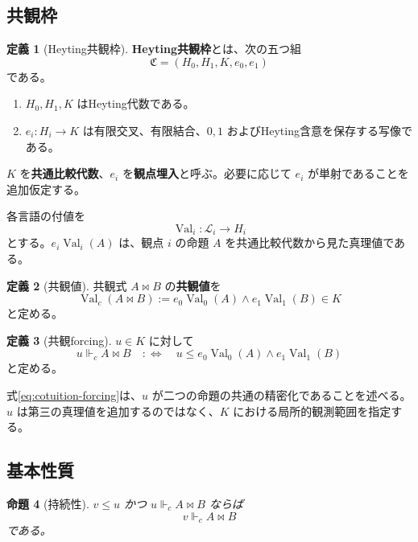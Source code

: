 \documentclass[a4paper,11pt]{ltjsarticle}
\theoremstyle{definition}
\newtheorem{definition}{定義}[section]
\theoremstyle{plain}
\newtheorem{proposition}[definition]{命題}
\newcommand{\Val}{\operatorname{Val}}
\newcommand{\forcesc}{\Vdash_{\!c}}
\begin{document}
\subsection{共観枠}

\begin{definition}[Heyting共観枠]
\textbf{Heyting共観枠}とは、次の五つ組
\[
 \mathfrak C=(H_0,H_1,K,e_0,e_1)
 \label{eq:cotuition-frame}
\]
である。
\begin{enumerate}
 \item $H_0,H_1,K$ はHeyting代数である。
 \item $e_i:H_i\to K$ は有限交叉、有限結合、$0,1$ およびHeyting含意を保存する写像である。
\end{enumerate}
$K$ を\textbf{共通比較代数}、$e_i$ を\textbf{観点埋入}と呼ぶ。必要に応じて $e_i$ が単射であることを追加仮定する。
\end{definition}

各言語の付値を
\[
 \Val_i:\mathcal L_i\longrightarrow H_i
\]
とする。$e_i\Val_i(A)$ は、観点 $i$ の命題 $A$ を共通比較代数から見た真理値である。

\begin{definition}[共観値]
共観式 $A\bowtie B$ の\textbf{共観値}を
\begin{equation}
 \Val_c(A\bowtie B)
 :=e_0\Val_0(A)\wedge e_1\Val_1(B)
 \in K
 \label{eq:cotuition-value}
\end{equation}
と定める。
\end{definition}

\begin{definition}[共観forcing]
$u\in K$ に対して
\begin{equation}
 u\forcesc A\bowtie B
 \quad:\Longleftrightarrow\quad
 u\leq e_0\Val_0(A)\wedge e_1\Val_1(B)
 \label{eq:cotuition-forcing}
\end{equation}
と定める。
\end{definition}

式\eqref{eq:cotuition-forcing}は、$u$ が二つの命題の共通の精密化であることを述べる。$u$ は第三の真理値を追加するのではなく、$K$ における局所的観測範囲を指定する。

\subsection{基本性質}

\begin{proposition}[持続性]
$v\leq u$ かつ $u\forcesc A\bowtie B$ ならば
\[
 v\forcesc A\bowtie B
\]
である。
\end{proposition}
\end{document}
